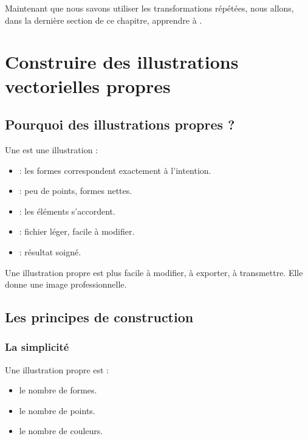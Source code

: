Maintenant que nous savons utiliser les transformations répétées, nous allons, dans la dernière section de ce chapitre, apprendre à .

\section{Construire des illustrations vectorielles propres}

\subsection{Pourquoi des illustrations propres ?}

Une  est une illustration :

\begin{itemize}
    \item {} : les formes correspondent exactement à l'intention.
    \item {} : peu de points, formes nettes.
    \item {} : les éléments s'accordent.
    \item {} : fichier léger, facile à modifier.
    \item {} : résultat soigné.
\end{itemize}

Une illustration propre est plus facile à modifier, à exporter, à transmettre. Elle donne une image professionnelle.

\subsection{Les principes de construction}

\subsubsection{La simplicité}

Une illustration propre est  :

\begin{itemize}
    \item {} le nombre de formes.
    \item {} le nombre de points.
    \item {} le nombre de couleurs.
\end{itemize}

